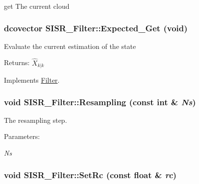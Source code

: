 get The current cloud 

\hypertarget{class_s_i_s_r___filter_2d1eb0ceb62531ed48af9a424bc62210}{
\subsubsection[{Expected\_\-Get}]{\setlength{\rightskip}{0pt plus 5cm}dcovector SISR\_\-Filter::Expected\_\-Get (void)}}
\label{class_s_i_s_r___filter_2d1eb0ceb62531ed48af9a424bc62210}


Evaluate the current estimation of the state

\begin{Desc}
\item[Returns:]$ \hat{X}_{k|k} $ \end{Desc}


Implements \hyperlink{class_filter_f6e41ec8ada47571291b31a259858cdc}{Filter}.\hypertarget{class_s_i_s_r___filter_615f0daa6560454c0d2190020a5bb06c}{
\subsubsection[{Resampling}]{\setlength{\rightskip}{0pt plus 5cm}void SISR\_\-Filter::Resampling (const int \& {\em Ns})}}
\label{class_s_i_s_r___filter_615f0daa6560454c0d2190020a5bb06c}


The resampling step. 

\begin{Desc}
\item[Parameters:]
\begin{description}
\item[{\em Ns}]\end{description}
\end{Desc}
\hypertarget{class_s_i_s_r___filter_08cb01476a0433a7414fe4e4be82d572}{
\subsubsection[{SetRc}]{\setlength{\rightskip}{0pt plus 5cm}void SISR\_\-Filter::SetRc (const float \& {\em rc})}}
\label{class_s_i_s_r___filter_08cb01476a0433a7414fe4e4be82d572}


